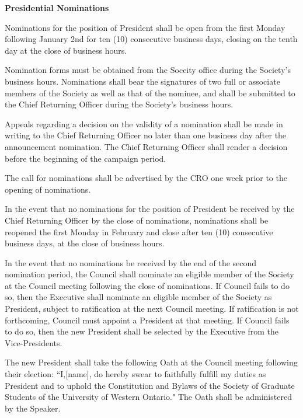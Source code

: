 \begin{longenum}[ label*=\thesection.\arabic*., align=left]
\begin{longenum}[label*=\arabic*., align=left]
 \end{longenum}
 \item \textbf{Presidential Nominations}
 \begin{longenum}[label*=\arabic*., align=left]
  \item  Nominations for the position of President shall be open from the first Monday following January 2nd for ten (10) consecutive business days, closing on the tenth day at the close of business hours. 
  \item  Nomination forms must be obtained from the Soceity office during the Society's business hours. Nominations shall bear the signatures of two full or associate members of the Society as well as that of  the nominee, and shall be submitted to the Chief Returning Officer during the Society's business hours.
  \item Appeals regarding a decision on the validity of a nomination shall be made in writing to the Chief Returning Officer no later than one business day after the announcement nomination. The Chief Returning Officer shall render a decision before the beginning of the campaign period.
  \item The call for nominations shall be advertised by the CRO one week prior to the opening of nominations.
  \item In the event that no nominations for the position of President be received by the Chief Returning Officer by the close of nominations, nominations shall be reopened the first Monday in February and close after ten (10) consecutive business days, at the close of business hours.
  \item In the event that no nominations be received by the end of the second nomination period, the Council shall nominate an eligible member of the Society at the Council meeting following the close of nominations. If Council fails to do so, then the Executive shall nominate an eligible member of the Society as President, subject to ratification at the next Council meeting. If ratification is not forthcoming, Council must appoint a President at that meeting. If Council fails to do so, then the new President shall be selected by the Executive from the Vice-Presidents.
  \item The new President shall take the following Oath at the Council meeting following their election: ``I,[name], do hereby swear to faithfully fulfill my duties as President and to uphold the Constitution and Bylaws of the Society of Graduate Students of the University of Western Ontario." The Oath shall be administered by the Speaker.

\end{longenum}
\end{longenum}
